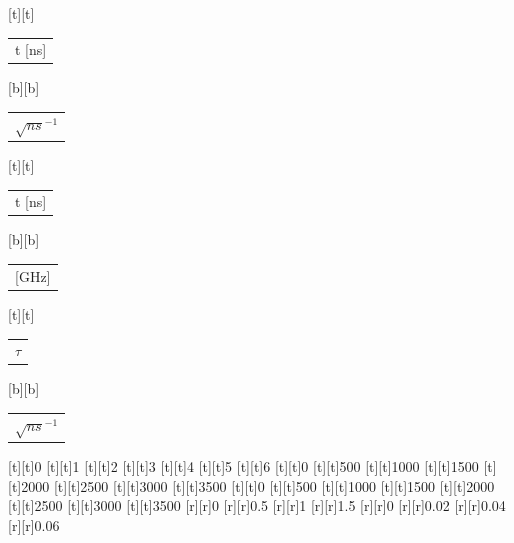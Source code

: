 %    
%
%
\begin{psfrags}%
\psfragscanon%
%
[t][t]{\color[rgb]{0,0,0}\setlength{\tabcolsep}{0pt}\begin{tabular}{c}t [ns]\end{tabular}}%
[b][b]{\color[rgb]{0,0,0}\setlength{\tabcolsep}{0pt}\begin{tabular}{c}$\sqrt{ns}^{-1}$\end{tabular}}%
[t][t]{\color[rgb]{0,0,0}\setlength{\tabcolsep}{0pt}\begin{tabular}{c}t [ns]\end{tabular}}%
[b][b]{\color[rgb]{0,0,0}\setlength{\tabcolsep}{0pt}\begin{tabular}{c}[GHz]\end{tabular}}%
[t][t]{\color[rgb]{0,0,0}\setlength{\tabcolsep}{0pt}\begin{tabular}{c}$\tau$\end{tabular}}%
[b][b]{\color[rgb]{0,0,0}\setlength{\tabcolsep}{0pt}\begin{tabular}{c}$\sqrt{ns}^{-1}$\end{tabular}}%
%
[t][t]{0}%
[t][t]{1}%
[t][t]{2}%
[t][t]{3}%
[t][t]{4}%
[t][t]{5}%
[t][t]{6}%
[t][t]{0}%
[t][t]{500}%
[t][t]{1000}%
[t][t]{1500}%
[t][t]{2000}%
[t][t]{2500}%
[t][t]{3000}%
[t][t]{3500}%
[t][t]{0}%
[t][t]{500}%
[t][t]{1000}%
[t][t]{1500}%
[t][t]{2000}%
[t][t]{2500}%
[t][t]{3000}%
[t][t]{3500}%
%
[r][r]{0}%
[r][r]{0.5}%
[r][r]{1}%
[r][r]{1.5}%
[r][r]{0}%
[r][r]{0.02}%
[r][r]{0.04}%
[r][r]{0.06}%

\end{psfrags}
